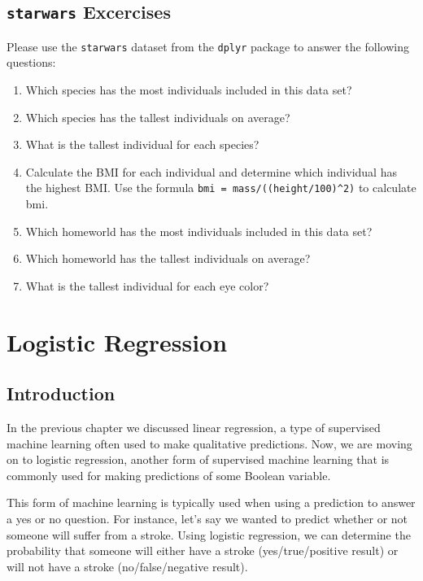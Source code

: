 \documentclass[
]{book}
\providecommand{\tightlist}{%
  \setlength{\itemsep}{0pt}\setlength{\parskip}{0pt}}
\begin{document}
\hypertarget{starwars-excercises-1}{%
\section{\texorpdfstring{\texttt{starwars} Excercises}{starwars Excercises}}\label{starwars-excercises-1}}

Please use the \texttt{starwars} dataset from the \texttt{dplyr} package to answer the following questions:

\begin{enumerate}
\def\labelenumi{\arabic{enumi}.}
\tightlist
\item
  Which species has the most individuals included in this data set?
\item
  Which species has the tallest individuals on average?
\item
  What is the tallest individual for each species?
\item
  Calculate the BMI for each individual and determine which individual has the highest BMI. Use the formula \texttt{bmi\ =\ mass/((height/100)\^{}2)} to calculate bmi.
\item
  Which homeworld has the most individuals included in this data set?
\item
  Which homeworld has the tallest individuals on average?
\item
  What is the tallest individual for each eye color?
\end{enumerate}

\hypertarget{logistic-regression}{%
\chapter{Logistic Regression}\label{logistic-regression}}

\hypertarget{introduction-6}{%
\section{Introduction}\label{introduction-6}}

In the previous chapter we discussed linear regression, a type of supervised machine learning often used to make qualitative predictions. Now, we are moving on to logistic regression, another form of supervised machine learning that is commonly used for making predictions of some Boolean variable.

This form of machine learning is typically used when using a prediction to answer a yes or no question. For instance, let's say we wanted to predict whether or not someone will suffer from a stroke. Using logistic regression, we can determine the probability that someone will either have a stroke (yes/true/positive result) or will not have a stroke (no/false/negative result).
\end{document}
